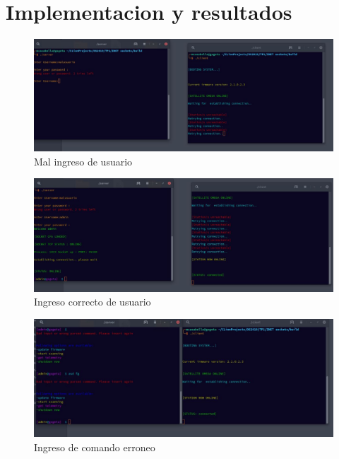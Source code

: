 \documentclass[fontsize=12pt]{article}
\begin{document}
\section{\textbf{Implementacion y resultados}} \label{implyresult}

\begin{figure}[H]
\centering
\includegraphics[scale =0.48]{wrong_user.jpg}
\caption{Mal ingreso de usuario}
\bigskip \bigskip \bigskip 
\end{figure}

\begin{figure}[H]
\centering
\includegraphics[scale =0.52]{correct_user.jpg}
\caption{Ingreso correcto de usuario}
\bigskip \bigskip \bigskip \bigskip \bigskip \bigskip \bigskip 
\end{figure}

\begin{figure}[H]
\centering
\includegraphics[scale =0.52]{bad_command.jpg}
\caption{Ingreso de comando erroneo}
\end{figure}
\end{document}
